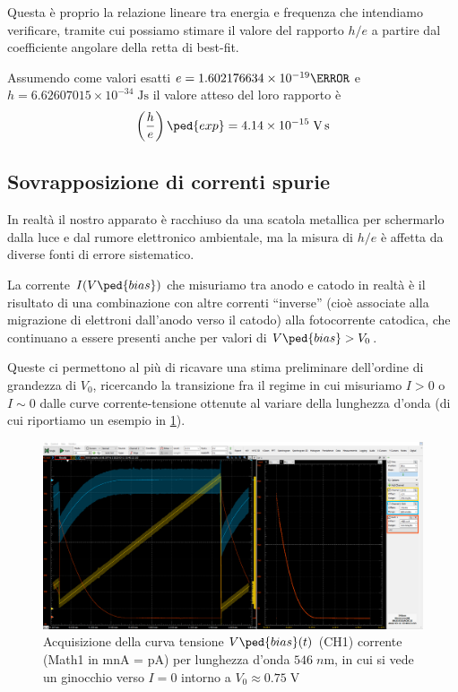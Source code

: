 \documentclass[10pt, a4paper, italian]{article}
\begin{document}
Questa è proprio la relazione lineare tra energia e frequenza che intendiamo
verificare, tramite cui possiamo stimare il valore del rapporto $h/e$ a
partire dal coefficiente angolare della retta di best-fit.

Assumendo come valori esatti $e = 1.602176634 \times 10^{-19}{\coulomb}$ e
$h = 6.62607015 \times 10^{-34} \; \si{\J\s} $ il valore atteso del loro
rapporto è
\begin{equation}\label{eq: e/h}
\left(\frac{h}{e}\right)\ped{exp} = 4.14 \times 10^{-15} \; \si{\V\s}
\end{equation}

\subsection{Sovrapposizione di correnti spurie}
In realtà il nostro apparato è racchiuso da una scatola metallica per
schermarlo dalla luce e dal rumore elettronico ambientale, ma la misura
di $h/e$ è affetta da diverse fonti di errore sistematico.

La corrente $I(V\ped{bias})$ che misuriamo tra anodo e catodo in realtà è il
risultato di una combinazione con altre correnti ``inverse'' (cioè
associate alla migrazione di elettroni dall'anodo verso il catodo) alla
fotocorrente catodica, che continuano a essere presenti anche per valori
di $V\ped{bias} > V_0$.

Queste ci permettono al più di ricavare una stima preliminare dell'ordine di
grandezza di $V_0$, ricercando la transizione fra il regime in cui
misuriamo $I>0$ o $I \sim 0$ dalle curve corrente-tensione ottenute al variare
della lunghezza d'onda (di cui riportiamo un esempio in \cref{fig: 546nm}).

\begin{figure}[htbp]
    \centering
	\includegraphics[width=\textwidth]{546nm}
    \caption{Acquisizione della curva tensione $V\ped{bias}(t)$ (CH1)
    corrente (Math1 in mnA = pA) per lunghezza d'onda $546 \; \si{n\m}$, in
    cui si vede un ginocchio verso $I=0$ intorno a
    $V_0 \approx 0.75 \; \si{\V}$
    \label{fig: 546nm}}
\end{figure}
\end{document}

